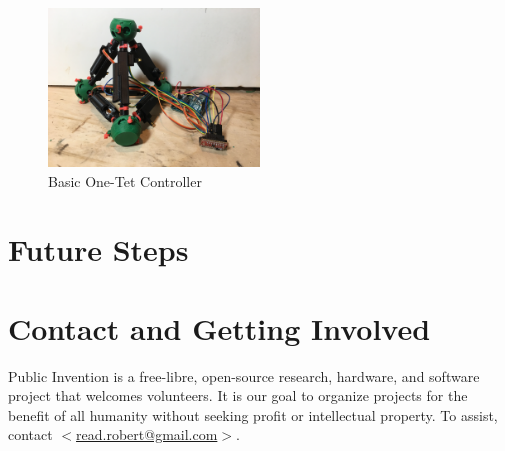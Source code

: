 \documentclass[11pt]{article}
\begin{document}
\begin{figure}[H]
  \centering
    \includegraphics[width=0.5\textwidth]{figures/BasicOneTet.JPG}
    \caption[Basice One-Tet Controller]{Basic One-Tet Controller}
      \label{fig:basiconetet}
\end{figure}



\section{Future Steps}
\label{futuresteps}

\section{Contact and Getting Involved}

Public Invention
is a free-libre, open-source research, hardware, and software project that welcomes volunteers.
It is our goal to organize projects for the benefit of all humanity without seeking profit or intellectual property.
To assist, contact \href{mailto:read.robert@gmail.com}{$<$read.robert@gmail.com$>$}.



\end{document}
